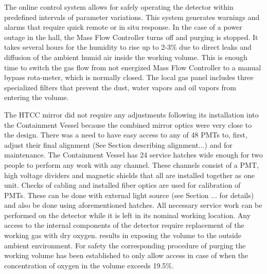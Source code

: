 \indent  The online control system allows for safely operating the detector within predefined intervals of parameter variations. This system generates warnings and alarms that require quick remote or in situ response. In the case of a power outage in the hall, the Mass Flow Controller turns off and purging is stopped. It takes several hours for the humidity to rise up to 2-3\% due to direct leaks and diffusion of the ambient humid air inside the working volume. This is enough time to switch the gas flow from not energized Mass Flow Controller to a manual bypass rota-meter, which is normally closed. The local gas panel includes three specialized filters that prevent the dust, water vapors and oil vapors from entering the volume.

\indent The HTCC mirror did not require any adjustments following its installation into the Containment Vessel because the combined mirror optics were very close to the design. There was a need to have easy access to any of 48 PMTs to, first, adjust their final alignment (See Section describing alignment...) and for maintenance. The Containment Vessel has 24 service hatches wide enough for two people to perform any work with any channel. These channels consist of a PMT, high voltage dividers and magnetic shields that all are installed together as one unit. Checks of cabling and installed fiber optics are used for calibration of PMTs. These can be done with external light source (see Section ... for details) and also be done using aforementioned hatches. All necessary service work can be performed on the detector while it is left in its nominal working location. Any access to the internal components of the detector require replacement of the working gas with dry oxygen. results in exposing the volume to the outside ambient environment. For safety the corresponding procedure of purging the working volume has been established to only allow access in case of when the concentration of oxygen in the volume exceeds 19.5\%.